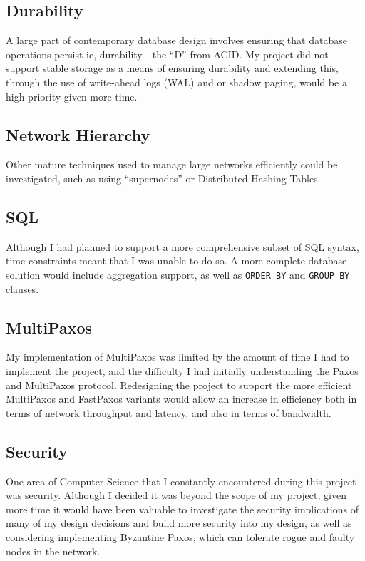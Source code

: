 \documentclass[12pt,twoside,notitlepage]{report}
\begin{document}
\subsection{Durability}

A large part of contemporary database design involves ensuring that database operations persist
ie, durability - the ``D'' from ACID. My project did not support stable storage as a means of
ensuring durability and extending this, through the use of write-ahead logs (WAL) and or shadow
paging, would be a high priority given more time.

\subsection{Network Hierarchy}

Other mature techniques used to manage large networks efficiently could be investigated, such as
using ``supernodes'' or Distributed Hashing Tables.

\subsection{SQL}

Although I had planned to support a more comprehensive subset of SQL syntax, time constraints meant
that I was unable to do so. A more complete database solution would include aggregation support,
as well as \verb+ORDER BY+ and \verb+GROUP BY+ clauses.

\subsection{MultiPaxos}

My implementation of MultiPaxos was limited by the amount of time I had to implement the project,
and the difficulty I had initially understanding the Paxos and MultiPaxos protocol. Redesigning
the project to support the more efficient MultiPaxos and FastPaxos variants would allow an
increase in efficiency both in terms of network throughput and latency, and also in terms of
bandwidth.

\subsection{Security}

One area of Computer Science that I constantly encountered during this project was security.
Although I decided it was beyond the scope of my project, given more time it would have been
valuable to investigate the security implications of many of my design decisions and build more
security into my design, as well as considering implementing Byzantine Paxos, which can tolerate
rogue and faulty nodes in the network.
\end{document}
